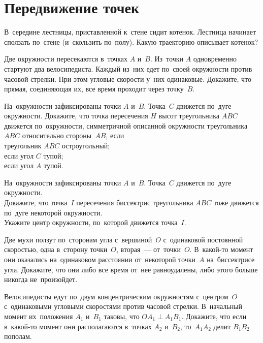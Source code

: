 
\section*{Передвижение точек}


\begin{problems}

\item
В~середине лестницы, приставленной к~стене сидит котенок.
Лестница начинает сползать по~стене (и~скользить по~полу).
Какую траекторию описывает котенок?

\item
Две окружности пересекаются в~точках $A$ и~$B$.
Из~точки $A$ одновременно стартуют два велосипедиста.
Каждый из~них едет по~своей окружности против часовой стрелки.
При этом угловые скорости у~них одинаковые.
Докажите, что прямая, соединяющая их, все время проходит через точку~$B$.

\item
На~окружности зафиксированы точки $A$ и~$B$.
Точка~$C$ движется по~дуге окружности.
Докажите, что точка пересечения $H$ высот треугольника $ABC$ движется
по~окружности, симметричной описанной окружности треугольника $ABC$
относительно стороны~$AB$, если
\\
\subproblem треугольник $ABC$ остроугольный;
\\
\subproblem если угол $C$ тупой;
\\
\subproblem если угол $A$ тупой.

\item
На~окружности зафиксированы точки $A$ и~$B$.
Точка~$C$ движется по~дуге окружности.
\\
\subproblem
Докажите, что точка~$I$ пересечения биссектрис треугольника $ABC$ тоже движется
по~дуге некоторой окружности.
\\
\subproblem
Укажите центр окружности, по~которой движется точка~$I$.

\item
Две мухи ползут по~сторонам угла с~вершиной~$O$ с~одинаковой постоянной
скоростью, одна в~сторону точки~$O$, вторая~--- от~точки~$O$.
В~какой-то момент они оказались на~одинаковом расстоянии
от~некоторой точки~$A$ на~биссектрисе угла.
Докажите, что они либо все время от~нее равноудалены, либо этого больше никогда
не~произойдет.

\item
Велосипедисты едут по~двум концентрическим окружностям с~центром~$O$
с~одинаковыми угловыми скоростями против часовой стрелки.
В~начальный момент их~положения $A_1$ и~$B_1$ таковы, что
$O A_1 \perp A_1 B_1$.
Докажите, что если в~какой-то момент они располагаются в~точках $A_2$ и~$B_2$,
то~$A_1 A_2$ делит $B_1 B_2$ пополам.


\end{problems}
